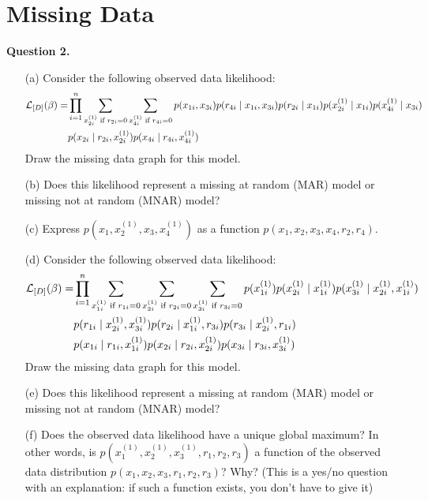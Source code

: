 \documentclass[11pt]{article}
\renewcommand{\vec}[1]{\mathbf{#1}}
\begin{document}
\newpage %

\section*{Missing Data}

{\bf Question 2.}

\begin{enumerate}
\item[(a)] Consider the following observed data likelihood:
{\small
\begin{align*}
{\cal L}_{[D]}(\vec{\beta}) =& \prod_{i=1}^n \sum_{x^{(1)}_{2i} \text{ if }r_{2i}=0} \sum_{x^{(1)}_{4i} \text{ if }r_{4i}=0}  p(x_{1i}, x_{3i}) p(r_{4i} \mid x_{1i}, x_{3i}) p(r_{2i} \mid x_{1i})
p(x^{(1)}_{2i} \mid x_{1i})
p(x^{(1)}_{4i} \mid x_{3i}) \\
& 
p(x_{2i} \mid r_{2i}, x^{(1)}_{2i})
p(x_{4i} \mid r_{4i}, x^{(1)}_{4i})
\end{align*}
}
Draw the missing data graph for this model.
\item[(b)] Does this likelihood represent a missing at random (MAR) model or missing not at random (MNAR) model?
\item[(c)] Express $p(x_1, x_2^{(1)}, x_3, x_4^{(1)})$ as a function $p(x_1, x_2, x_3, x_4, r_2, r_4)$.
\item[(d)] Consider the following observed data likelihood:
{\small
\begin{align*}
{\cal L}_{[D]}(\vec{\beta}) =&
\prod_{i=1}^n
\sum_{x^{(1)}_{1i} \text{ if }r_{1i}=0}
\sum_{x^{(1)}_{2i} \text{ if }r_{2i}=0}
\sum_{x^{(1)}_{3i} \text{ if }r_{3i}=0}
p(x^{(1)}_{1i}) p(x^{(1)}_{2i} \mid x^{(1)}_{1i})
p(x^{(1)}_{3i} \mid x^{(1)}_{2i}, x^{(1)}_{1i})\\
& 
p(r_{1i} \mid x^{(1)}_{2i}, x^{(1)}_{3i})
p(r_{2i} \mid x^{(1)}_{1i}, r_{3i})
p(r_{3i} \mid x^{(1)}_{2i}, r_{1i})
\\
&
p(x_{1i} \mid r_{1i}, x^{(1)}_{1i})
p(x_{2i} \mid r_{2i}, x^{(1)}_{2i})
p(x_{3i} \mid r_{3i}, x^{(1)}_{3i})
\end{align*}
}
Draw the missing data graph for this model.
\item[(e)] Does this likelihood represent a missing at random (MAR) model or missing not at random (MNAR) model?
\item[(f)] Does the observed data likelihood have a unique global maximum?  In other words, 
 is $p(x_1^{(1)}, x_2^{(1)}, x_3^{(1)}, r_1, r_2, r_3)$ a function of the observed data distribution $p(x_1, x_2, x_3, r_1, r_2, r_3)$?  Why?  (This is a yes/no question with an explanation: if such a function exists, you don't have to give it)
\end{enumerate}
\end{document}
